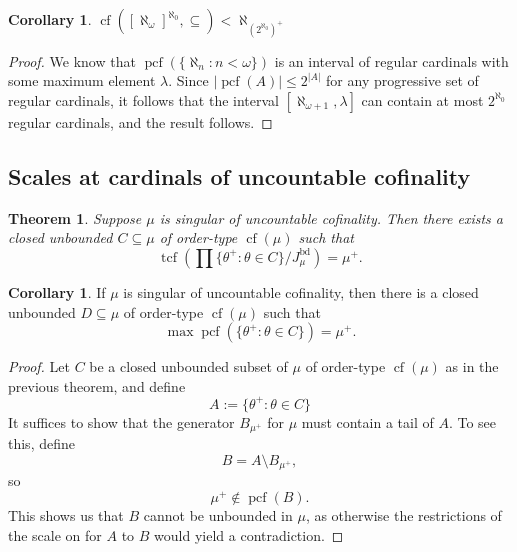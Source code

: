 \documentclass[10pt]{amsart}
\theoremstyle{plain}
\newtheorem{theorem}{Theorem}
\theoremstyle{definition}
\newtheorem{corollary}[proposition]{Corollary}
\theoremstyle{remark}
\DeclareMathOperator{\tcf}{tcf}
\DeclareMathOperator{\bd}{bd}
\DeclareMathOperator{\cf}{cf}
\DeclareMathOperator{\pcf}{pcf}
\numberwithin{equation}{section}
\begin{document}
\begin{corollary}
$\cf\left([\aleph_\omega]^{\aleph_0},\subseteq\right)<\aleph_{(2^{\aleph_0})^+}$
\end{corollary}
\begin{proof}
We know that $\pcf(\{\aleph_n:n<\omega\})$ is an interval of regular cardinals with some maximum element $\lambda$. Since $|\pcf(A)|\leq 2^{|A|}$ for any progressive set of regular cardinals, it follows that the interval $[\aleph_{\omega+1},\lambda]$ can contain at most $2^{\aleph_0}$ regular cardinals, and the result follows.
\end{proof}

\subsection{Scales at cardinals of uncountable cofinality}

\begin{theorem}
Suppose $\mu$ is singular of uncountable cofinality.  Then there exists a closed unbounded $C\subseteq\mu$ of order-type $\cf(\mu)$ such that
\begin{equation}
\tcf\left(\prod \{\theta^+:\theta\in C\}/ J^{\bd}_\mu\right)=\mu^+.
\end{equation}
\end{theorem}

\begin{corollary}
If $\mu$ is singular of uncountable cofinality, then there is a closed unbounded $D\subseteq\mu$ of order-type $\cf(\mu)$ such that
\begin{equation}
\max\pcf\left(\{\theta^+:\theta\in C\}\right) = \mu^+.
\end{equation}
\end{corollary}
\begin{proof}
Let $C$ be a closed unbounded subset of $\mu$ of order-type $\cf(\mu)$ as in the previous theorem, and define
\begin{equation}
A:=\{\theta^+:\theta\in C\}
\end{equation}
It suffices to show that the generator $B_{\mu^+}$ for $\mu$ must contain a tail of $A$. To see this, define
\begin{equation}
B = A\setminus B_{\mu^+},
\end{equation}
so
\begin{equation}
\mu^+\notin\pcf(B).
\end{equation}
This shows us that $B$ cannot be unbounded in $\mu$, as otherwise the restrictions of the scale on for $A$ to $B$ would yield a contradiction.
\end{proof}
\end{document}
